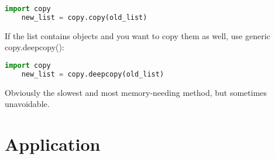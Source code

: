 \documentclass[a4paper,12pt,twoside]{book}
\begin{document}
\begin{lstlisting}[frame=single, language=Python]
	import copy
	new_list = copy.copy(old_list)
\end{lstlisting}  


If the list contains objects and you want to copy them as well, use generic copy.deepcopy():

\begin{lstlisting}[frame=single, language=Python]
	import copy
	new_list = copy.deepcopy(old_list)
\end{lstlisting}
Obviously the slowest and most memory-needing method, but sometimes unavoidable.

\section{Application}
\end{document}
